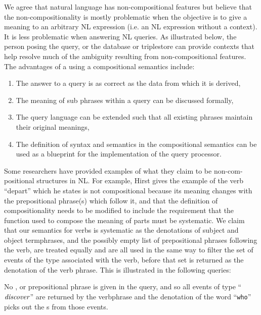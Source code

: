 \documentclass[../main.tex]{subfiles}
\begin{document}
\begin{refsection}
We agree that natural language has non-compositional features but believe that the non-compositionality is mostly problematic when the objective is to give a meaning to an arbitrary NL expression (i.e. an NL expression without a context). It is less problematic when answering NL queries. As illustrated below, the person posing the query, or the database or triplestore can provide contexts that help resolve much of the ambiguity resulting from non-compositional features. The advantages of a using a compositional semantics include:
\begin{enumerate}
	\item The answer to a query is as correct as the data from which it is derived,
	\item The meaning of sub phrases within a query can be discussed formally,
	\item The query language can be extended such that all existing phrases maintain their original meanings,
	\item The definition of syntax and semantics in the compositional semantics can be used as a blueprint for the implementation of the query processor.
\end{enumerate}
Some researchers have provided examples of what they claim to be non-com-\allowbreak positional structures in NL. For example, Hirst \cite{hirst1992semantic} gives the example of the verb ``depart'' which he states is not compositional because its meaning changes with the prepositional phrase(s) which follow it, and that the definition of compositionality needs to be modified to include the requirement that the function used to compose the meaning of parts must be systematic. We claim that our semantics for verbs is systematic as the denotations of subject and object termphrases, and the possibly empty list of prepositional phrases following the verb, are treated equally and are all used in the same way to filter the set of events of the type associated with the verb, before that set is returned as the denotation of the verb phrase. This is illustrated in the following queries:

\examplespacing


\examplespacing

\noindent No ,  or prepositional phrase is given in the query, and so all events of type ``$\operatorname{\mathit{discover}}$'' are returned by the verbphrase and the denotation of the word ``\texttt{who}'' picks out the s from those events.


\end{refsection}
\end{document}
